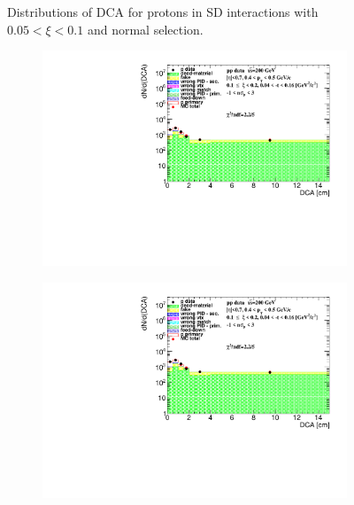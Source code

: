 \begin{figure}[h!]
\begin{subfigure}{.45\textwidth}
	\end{subfigure}
	\caption{Distributions of DCA for protons in SD interactions with $0.05< \xi<0.1$ and normal selection.}
	\label{fig:dca_proton_1t}
\end{figure}
\begin{figure}[h!]
	\centering
	\begin{subfigure}{.45\textwidth}
		\includegraphics[width=\linewidth, page=1]{chapters/chrgSTAR/img/DCAproton/background_p_2.pdf}
	\end{subfigure}
	\begin{subfigure}{.45\textwidth}
		\includegraphics[width=\linewidth, page=2]{chapters/chrgSTAR/img/DCAproton/background_p_2.pdf}
	\end{subfigure}
	\begin{subfigure}{.45\textwidth}

\end{subfigure}
\end{figure}
